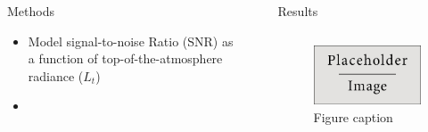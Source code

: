\documentclass[final]{beamer}
\newlength{\sepwid}
\newlength{\onecolwid}
\newlength{\twocolwid}
\begin{document}
\begin{frame}[t]
\begin{columns}[t]
\begin{column}{\onecolwid}

\begin{block}{Methods}
\begin{itemize}
\item Model signal-to-noise Ratio (SNR) as a function of top-of-the-atmosphere radiance ($L_t$)
\item
\end{itemize}

\end{block}



\end{column} %

\begin{column}{\sepwid}\end{column} %

\begin{column}{\twocolwid} %
\begin{block}{Results}
\end{block}
\begin{columns}[t,totalwidth=\twocolwid] %

\begin{column}{\onecolwid}\vspace{-.6in} %

\begin{figure}
\includegraphics[width=1.0\linewidth]{placeholder.jpg}
\\{Figure caption}
\end{figure}



\end{column}
\end{columns}
\end{column}
\end{columns}
\end{frame}
\end{document}

